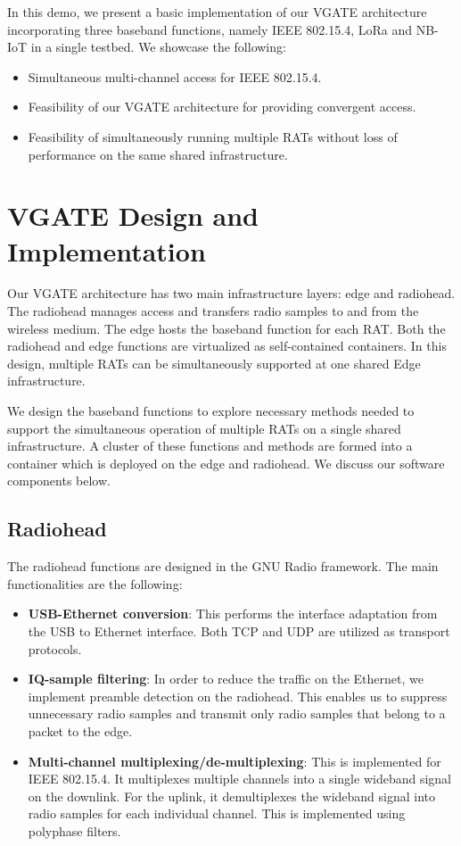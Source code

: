 \documentclass[10pt,emptycopyrightspace]{ewsn-proc}
\begin{document}
In this demo, we present a basic implementation of our VGATE architecture incorporating three baseband functions, namely IEEE 802.15.4, LoRa and NB-IoT in a single testbed. We showcase the following:
\begin{itemize}
	\item Simultaneous multi-channel access for IEEE 802.15.4.
	\item Feasibility of our VGATE architecture for providing convergent access.
	\item Feasibility of simultaneously running multiple RATs without loss of performance on the same shared infrastructure.
\end{itemize}

\section{VGATE Design and Implementation}
\label{sec:implementation}
Our VGATE architecture
has two main infrastructure layers: edge and radiohead. The radiohead manages access and transfers radio samples to and from the wireless medium.  The edge hosts the baseband function for each RAT. Both the radiohead and edge functions are virtualized as self-contained containers. In this design, multiple RATs can be simultaneously supported at one shared Edge
infrastructure. %


We design the baseband functions to explore necessary methods needed to support the simultaneous operation of multiple RATs on a single shared infrastructure. A cluster of these functions and methods are formed into a container which is deployed on the edge and radiohead. We discuss our software components below. 

\subsection{Radiohead}
The radiohead functions are designed in the GNU Radio framework. The main functionalities are the following:
\begin{itemize}
	\item \textbf{USB-Ethernet conversion}: This performs the interface adaptation from the USB to Ethernet interface. Both TCP and UDP are utilized as transport protocols.
	
	\item \textbf{IQ-sample filtering}: In order to reduce the traffic on the Ethernet, we implement preamble detection on the radiohead. This enables us to suppress unnecessary radio samples and transmit only radio samples that belong to a packet to the edge. 
	
	\item \textbf{ Multi-channel multiplexing/de-multiplexing}: This is implemented for IEEE 802.15.4. It multiplexes multiple channels into a single wideband signal on the downlink. For the uplink, it demultiplexes the wideband signal into radio samples for each individual channel. This is implemented using polyphase filters.
	
\end{itemize}
\end{document}
